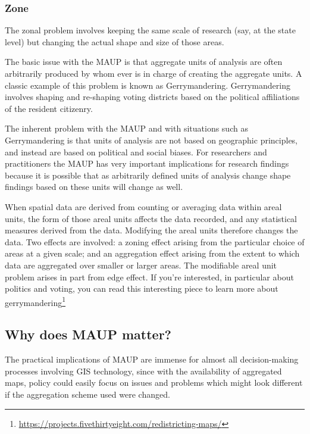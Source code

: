 \documentclass[
  krantz2]{krantz}
\renewcommand{\href}[2]{#2\footnote{\url{#1}}}
\begin{document}
\hypertarget{zone}{%
\subsubsection{Zone}\label{zone}}

The zonal problem involves keeping the same scale of research (say, at the state level) but changing the actual shape and size of those areas.

The basic issue with the MAUP is that aggregate units of analysis are often arbitrarily produced by whom ever is in charge of creating the aggregate units. A classic example of this problem is known as Gerrymandering. Gerrymandering involves shaping and re-shaping voting districts based on the political affiliations of the resident citizenry.

The inherent problem with the MAUP and with situations such as Gerrymandering is that units of analysis are not based on geographic principles, and instead are based on political and social biases. For researchers and practitioners the MAUP has very important implications for research findings because it is possible that as arbitrarily defined units of analysis change shape findings based on these units will change as well.

When spatial data are derived from counting or averaging data within areal units, the form of those areal units affects the data recorded, and any statistical measures derived from the data. Modifying the areal units therefore changes the data. Two effects are involved: a zoning effect arising from the particular choice of areas at a given scale; and an aggregation effect arising from the extent to which data are aggregated over smaller or larger areas. The modifiable areal unit problem arises in part from edge effect. If you're interested, in particular about politics and voting, you can read this interesting piece to learn \href{https://projects.fivethirtyeight.com/redistricting-maps/}{more about gerrymandering}

\hypertarget{why-does-maup-matter}{%
\subsection{Why does MAUP matter?}\label{why-does-maup-matter}}

The practical implications of MAUP are immense for almost all decision-making processes involving GIS technology, since with the availability of aggregated maps, policy could easily focus on issues and problems which might look different if the aggregation scheme used were changed.
\end{document}

